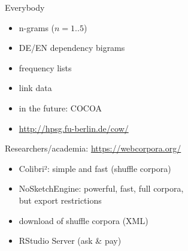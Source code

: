 
\begin{frame}
  {Everybody}
  \begin{itemize}
    \item n-grams ($n=1..5$)
    \item DE/EN dependency bigrams 
    \item frequency lists
    \item link data
    \item in the future: COCOA
    \item \url{http://hpsg.fu-berlin.de/cow/}
  \end{itemize}
\end{frame}

\begin{frame}
  {Researchers\slash academia: \url{https://webcorpora.org/}}
  \centering
  \begin{itemize}
    \item Colibri²: simple and fast (shuffle corpora)
    \item NoSketchEngine: powerful, fast, full corpora,\\
      but export restrictions
    \item download of shuffle corpora (XML)
    \item RStudio Server (ask \& pay)
  \end{itemize}
\end{frame}


